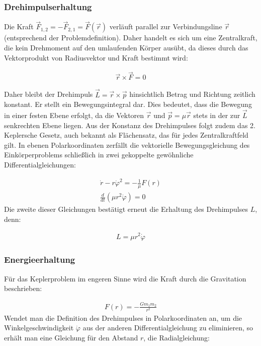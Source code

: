 \documentclass[a4paper,12pt,twoside]{article}
\begin{document}
\subsubsection{Drehimpulserhaltung}

Die Kraft \( \vec{F}_{1,2} = -\vec{F}_{2,1} = \vec{F}(\vec{r}) \) verläuft parallel zur Verbindungsline \( \vec{r} \) (entsprechend der Problemdefinition). Daher handelt es sich um eine Zentralkraft, die kein Drehmoment auf den umlaufenden Körper ausübt, da dieses durch das Vektorprodukt von Radiusvektor und Kraft bestimmt wird:

\begin{align*}
	\vec{r} \times \vec{F} = 0
\end{align*}

Daher bleibt der Drehimpuls \( \vec{L} = \vec{r} \times \vec{p} \) hinsichtlich Betrag und Richtung zeitlich konstant. Er stellt ein Bewegungsintegral dar. Dies bedeutet, dass die Bewegung in einer festen Ebene erfolgt, da die Vektoren \( \vec{r} \) und \( \vec{p} = \mu \vec{r} \) stets in der zur \( \vec{L} \) senkrechten Ebene liegen.
Aus der Konstanz des Drehimpulses folgt zudem das 2. Keplersche Gesetz, auch bekannt als Flächensatz, das für jedes Zentralkraftfeld gilt. In ebenen Polarkoordinaten zerfällt die vektorielle Bewegungsgleichung des Einkörperproblems schließlich in zwei gekoppelte gewöhnliche Differentialgleichungen:

\begin{align*}
	\dot{r} - r \dot{\varphi}^2 = - \frac{1}{\mu} F(r) \\
	\frac{d}{dt} \left( \mu r^2 \dot{\varphi} \right) = 0
\end{align*}
Die zweite dieser Gleichungen bestätigt erneut die Erhaltung des Drehimpulses \( L \), denn:

\begin{align*}
	L = \mu r^2 \dot{\varphi}
\end{align*}


\subsubsection{Energieerhaltung}
Für das Keplerproblem im engeren Sinne wird die Kraft durch die Gravitation beschrieben:

\begin{align*}
	F(r) = - \frac{G m_1 m_2}{r^2}
\end{align*}
Wendet man die Definition des Drehimpulses in Polarkoordinaten an, um die Winkelgeschwindigkeit \( \dot{\varphi} \) aus der anderen Differentialgleichung zu eliminieren, so erhält man eine Gleichung für den Abstand \( r \), die Radialgleichung:
\end{document}
